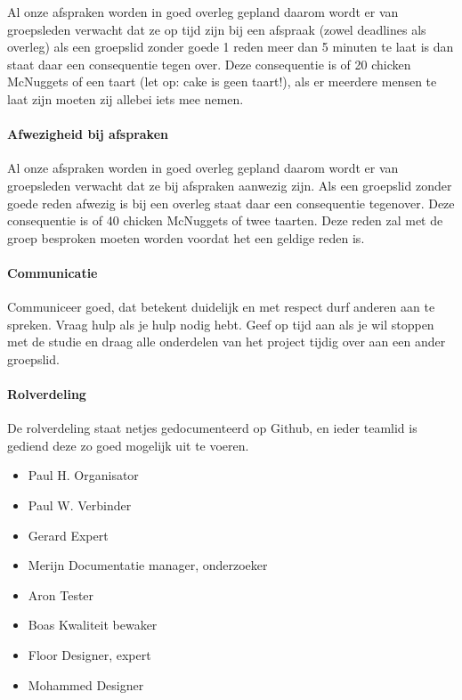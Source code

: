 \documentclass{article}
\begin{document}
Al onze afspraken worden in goed overleg gepland daarom wordt er van groepsleden verwacht
dat ze op tijd zijn bij een afspraak (zowel deadlines als overleg) als een groepslid zonder goede
1
reden meer dan 5 minuten te laat is dan staat daar een consequentie tegen over. Deze
consequentie is of 20 chicken McNuggets of een taart (let op: cake is geen taart!), als er
meerdere mensen te laat zijn moeten zij allebei iets mee nemen.

\paragraph{Afwezigheid bij afspraken}

Al onze afspraken worden in goed overleg gepland daarom wordt er van groepsleden verwacht
dat ze bij afspraken aanwezig zijn. Als een groepslid zonder goede reden afwezig is bij een
overleg staat daar een consequentie tegenover. Deze consequentie is of 40 chicken McNuggets
of twee taarten. Deze reden zal met de groep besproken moeten worden voordat het een geldige reden is.

\paragraph{Communicatie}

Communiceer goed, dat betekent duidelijk en met respect durf anderen aan te spreken.
Vraag hulp als je hulp nodig hebt.
Geef op tijd aan als je wil stoppen met de studie en draag alle onderdelen van het project tijdig
over aan een ander groepslid.

\paragraph{Rolverdeling}

De rolverdeling staat netjes gedocumenteerd op Github, en ieder teamlid is gediend deze zo
goed mogelijk uit te voeren.
\begin{itemize}
\item Paul H. Organisator
\item Paul W. Verbinder
\item Gerard Expert
\item Merijn Documentatie manager, onderzoeker
\item Aron Tester
\item Boas Kwaliteit bewaker
\item Floor Designer, expert
\item Mohammed Designer
\end{itemize}
\end{document}
